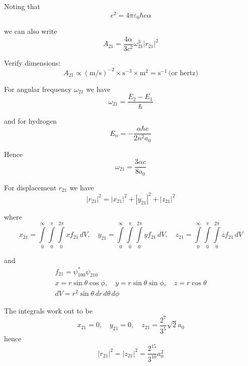 Noting that
\begin{equation*}
e^2=4\pi\varepsilon_0\hbar c\alpha
\end{equation*}

we can also write
\begin{equation*}
A_{21}=\frac{4\alpha}{3c^2}\omega_{21}^3|r_{21}|^2
\tag{1}
\end{equation*}

Verify dimensions:
\begin{equation*}
A_{21}\propto(\text{m/s})^{-2}\times\text{s}^{-3}\times\text{m}^2=\text{s}^{-1}\,\text{(or hertz)}
\end{equation*}

For angular frequency $\omega_{21}$ we have
\begin{equation*}
\omega_{21}=\frac{E_2-E_1}{\hbar}
\end{equation*}

and for hydrogen
\begin{equation*}
E_n=-\frac{\alpha\hbar c}{2n^2a_0}
\end{equation*}

Hence
\begin{equation*}
\omega_{21}=\frac{3\alpha c}{8a_0}
\end{equation*}

For displacement $r_{21}$ we have
\begin{equation*}
|r_{21}|^2=|x_{21}|^2+|y_{21}|^2+|z_{21}|^2
\end{equation*}

where
\begin{equation*}
x_{21}=\int\limits_{0}^{\infty}\int\limits_{0}^{\pi}\int\limits_{0}^{2\pi}xf_{21}\,dV,
\quad
y_{21}=\int\limits_{0}^{\infty}\int\limits_{0}^{\pi}\int\limits_{0}^{2\pi}yf_{21}\,dV,
\quad
z_{21}=\int\limits_{0}^{\infty}\int\limits_{0}^{\pi}\int\limits_{0}^{2\pi}zf_{21}\,dV
\end{equation*}

and
\begin{gather*}
f_{21}=\psi_{100}^*\psi_{210}%
\\[1ex]
x=r\sin\theta\cos\phi,
\quad
y=r\sin\theta\sin\phi,
\quad
z=r\cos\theta
\\[1ex]
dV=r^2\sin\theta\,dr\,d\theta\,d\phi
\end{gather*}

The integrals work out to be
\begin{equation*}
x_{21}=0,
\quad
y_{21}=0,
\quad
z_{21}=\frac{2^7}{3^5}\sqrt2a_0
\end{equation*}
hence
\begin{equation*}
|r_{21}|^2=|z_{21}|^2=\frac{2^{15}}{3^{10}}a_0^2
\end{equation*}

